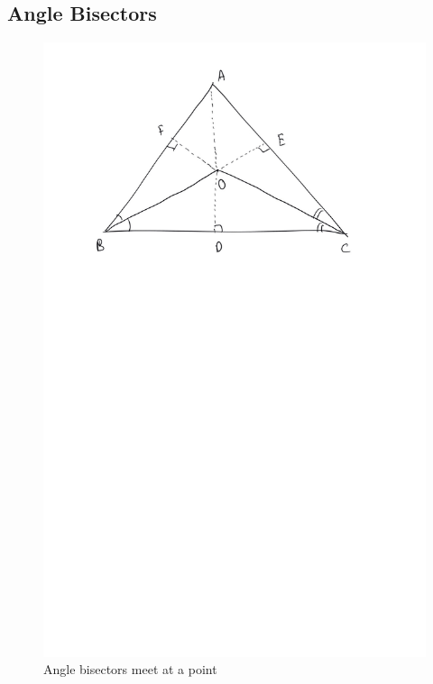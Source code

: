 \subsection{Angle Bisectors}

\begin{figure}[!h]
	\begin{center}
		
		\includegraphics[width=\columnwidth]{./figs/ch3_angle_bisector}
		\vspace*{-10cm}
	\end{center}
	\caption{Angle bisectors meet at a point}
	\label{ch3_angle_bisector}	
\end{figure}

